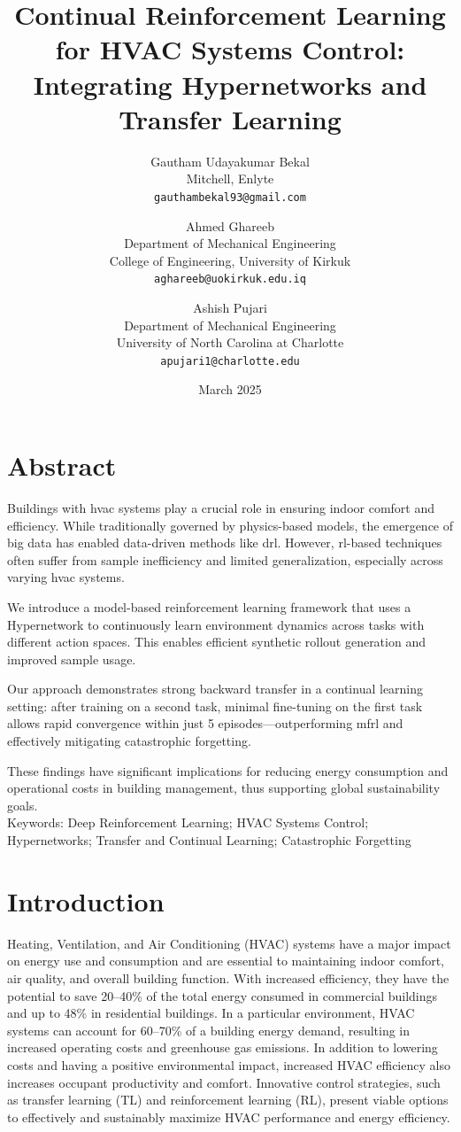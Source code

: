 \documentclass{article}
\title{Continual Reinforcement Learning for HVAC Systems Control:\\ Integrating Hypernetworks and Transfer Learning}
\author{
  Gautham Udayakumar Bekal \\
  Mitchell, Enlyte \\
  \texttt{gauthambekal93@gmail.com}
  \and
  Ahmed Ghareeb \\
  Department of Mechanical Engineering \\
  College of Engineering, University of Kirkuk \\
  \texttt{aghareeb@uokirkuk.edu.iq}
  \and
  Ashish Pujari \\
  Department of Mechanical Engineering \\
  University of North Carolina at Charlotte \\
  \texttt{apujari1@charlotte.edu}
}
\date{March 2025}
\begin{document}
\maketitle


\section*{Abstract}
Buildings with \gls{hvac} systems play a crucial role in ensuring indoor comfort and efficiency. While traditionally governed by physics-based models, the emergence of big data has enabled data-driven methods like \gls{drl}. However, \gls{rl}-based techniques often suffer from sample inefficiency and limited generalization, especially across varying \gls{hvac} systems.

We introduce a model-based reinforcement learning framework that uses a Hypernetwork to continuously learn environment dynamics across tasks with different action spaces. This enables efficient synthetic rollout generation and improved sample usage.

Our approach demonstrates strong backward transfer in a continual learning setting: after training on a second task, minimal fine-tuning on the first task allows rapid convergence within just 5 episodes—outperforming \gls{mfrl} and effectively mitigating catastrophic forgetting.

These findings have significant implications for reducing energy consumption and operational costs in building management, thus supporting global sustainability goals. \\

Keywords: Deep Reinforcement Learning; HVAC Systems Control; Hypernetworks; Transfer and Continual Learning; Catastrophic Forgetting 

\clearpage


\section{Introduction}

Heating, Ventilation, and Air Conditioning (HVAC)  systems have a major impact on energy use and consumption and are essential to maintaining indoor comfort, air quality, and overall building function. With increased efficiency, they have the potential to save 20–40\% of the total energy consumed in commercial buildings and up to 48\% in residential buildings. In a particular environment, HVAC systems can account for 60–70\% of a building energy demand, resulting in increased operating costs and greenhouse gas emissions. In addition to lowering costs and having a positive environmental impact, increased HVAC efficiency also increases occupant productivity and comfort. Innovative control strategies, such as transfer learning (TL) and reinforcement learning (RL), present viable options to effectively and sustainably maximize HVAC performance and energy efficiency.
\end{document}
